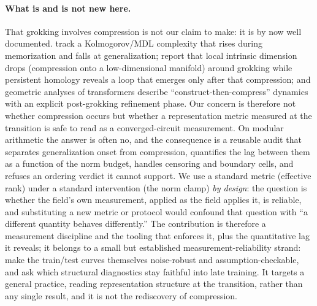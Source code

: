 \documentclass[11pt]{article}
\begin{document}
\paragraph{What is and is not new here.} That grokking involves compression is not our claim
to make: it is by now well documented. \citet{demoss2024complexity} track a Kolmogorov/MDL complexity
that rises during memorization and falls at generalization; \citet{tang2026topological} report that
local intrinsic dimension drops (compression onto a low-dimensional manifold) around grokking while
persistent homology reveals a loop that emerges only after that compression; and geometric analyses of
transformers describe ``construct-then-compress'' dynamics with an explicit post-grokking
refinement phase. Our concern is therefore not whether compression occurs but whether a representation metric measured
at the transition is safe to read as a converged-circuit measurement. On modular arithmetic the answer is
often no, and the consequence is a reusable audit that separates generalization onset from compression,
quantifies the lag between them as a function of the norm budget, handles censoring and boundary cells,
and refuses an ordering verdict it cannot support. We use a standard metric (effective rank) under a standard intervention (the norm clamp)
\emph{by design}: the question is whether the field's own measurement, applied as the field applies it,
is reliable, and substituting a new metric or protocol would confound that question with ``a different
quantity behaves differently.'' The contribution is therefore a measurement discipline and the tooling
that enforces it, plus the quantitative lag it reveals; it belongs to a small but established
measurement-reliability strand: \citet{miller2024sharpness} make the train/test curves themselves
noise-robust and assumption-checkable, and \citet{prakash2026antigrokking} ask which structural
diagnostics stay faithful into late training. It targets a general practice, reading
representation structure at the transition, rather than any single result, and it is not the rediscovery of
compression.
\end{document}
